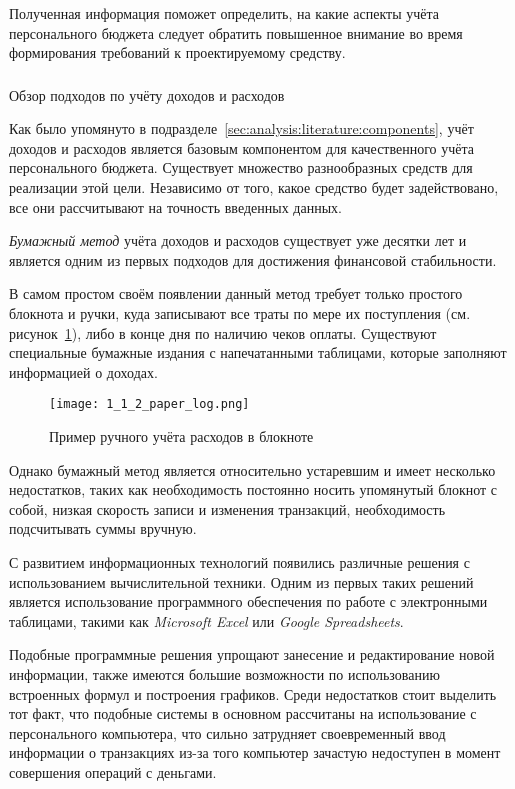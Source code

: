 Полученная информация поможет определить, на какие аспекты учёта персонального бюджета следует обратить повышенное внимание во время формирования требований к проектируемому средству.

\subsubsection{} Обзор подходов по учёту доходов и расходов
\label{sec:analysis:literature:tracking}

Как было упомянуто в подразделе~\ref{sec:analysis:literature:components}, учёт доходов и расходов является базовым компонентом для качественного учёта персонального бюджета.
Существует множество разнообразных средств для реализации этой цели.
Независимо от того, какое средство будет задействовано, все они рассчитывают на точность введенных данных.

\emph{Бумажный метод} учёта доходов и расходов существует уже десятки лет и является одним из первых подходов для достижения финансовой стабильности.

В самом простом своём появлении данный метод требует только простого блокнота и ручки, куда записывают все траты по мере их поступления (см. рисунок~\ref{fig:analysis:literature:paper_log}), либо в конце дня по наличию чеков оплаты.
Существуют специальные бумажные издания с напечатанными таблицами, которые заполняют информацией о доходах.

\begin{figure}[H]
    \centering
    \texttt{[image: 1\_1\_2\_paper\_log.png]}
    \caption{Пример ручного учёта расходов в блокноте}
    \label{fig:analysis:literature:paper_log}
\end{figure}

Однако бумажный метод является относительно устаревшим и имеет несколько недостатков, таких как необходимость постоянно носить упомянутый блокнот с собой, низкая скорость записи и изменения транзакций, необходимость подсчитывать суммы вручную.

С развитием информационных технологий появились различные решения с использованием вычислительной техники.
Одним из первых таких решений является использование программного обеспечения по работе с электронными таблицами, такими как \emph{Microsoft Excel} или \emph{Google Spreadsheets}.

Подобные программные решения упрощают занесение и редактирование новой информации, также имеются большие возможности по использованию встроенных формул и построения графиков.
Среди недостатков стоит выделить тот факт, что подобные системы в основном рассчитаны на использование с персонального компьютера, что сильно затрудняет своевременный ввод информации о транзакциях из-за того компьютер зачастую недоступен в момент совершения операций с деньгами.

